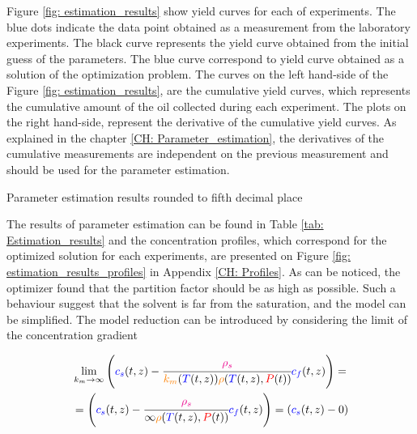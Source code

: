 \documentclass[../Article_Model_Parameters.tex]{subfiles}
\begin{document}
	Figure \ref{fig: estimation_results} show yield curves for each of experiments. The blue dots indicate the data point obtained as a measurement from the laboratory experiments. The black curve represents the yield curve obtained from the initial guess of the parameters. The blue curve correspond to yield curve obtained as a solution of the optimization problem. The curves on the left hand-side of the Figure \ref{fig: estimation_results}, are the cumulative yield curves, which represents the cumulative amount of the oil collected during each experiment. The plots on the right hand-side, represent the derivative of the cumulative yield curves. As explained in the chapter \ref{CH: Parameter_estimation}, the derivatives of the cumulative measurements are independent on the previous measurement and should be used for the parameter estimation.

	\begin{table}[!h]
		\centering
		\caption{Parameter estimation results rounded to fifth decimal place}
		\label{tab: Estimation_results}
	\end{table}

	The results of parameter estimation can be found in Table \ref{tab: Estimation_results} and the concentration profiles, which correspond for the optimized solution for each experiments, are presented on Figure \ref{fig: estimation_results_profiles} in Appendix \ref{CH: Profiles}. As can be noticed, the optimizer found that the partition factor should be as high as possible. Such a behaviour suggest that the solvent is far from the saturation, and the model can be simplified. The model reduction can be introduced by considering the limit of the concentration gradient
	
	{\footnotesize
	\begin{equation*}
		\begin{split}
			&\lim_{k_m \rightarrow \infty} \left({\color{blue}{\color{blue} c_s} }(t,z)  - \cfrac{{\color{magenta}\rho_s}}{{\color{orange}k_m}({\color{blue}T}(t,z)){\color{orange}\rho}({\color{blue}T}(t,z),{\color{red}P}(t))}  {\color{blue}c_f}(t,z) \right)  = \\
			&= \left({\color{blue}{\color{blue} c_s} }(t,z)  - \cfrac{{\color{magenta}\rho_s}}{\infty{\color{orange}\rho}({\color{blue}T}(t,z),{\color{red}P}(t))}  {\color{blue}c_f}(t,z) \right) = \left({\color{blue}{\color{blue} c_s} }(t,z) - 0 \right)
		\end{split}
	\end{equation*} }
		
\end{document}

